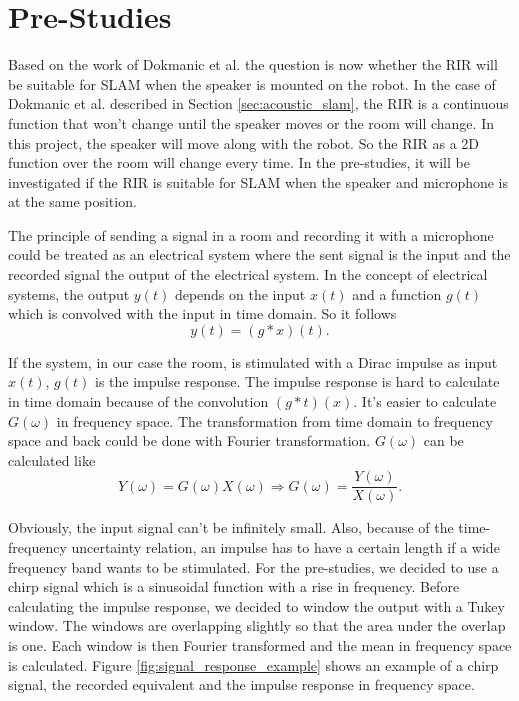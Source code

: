 \section{Pre-Studies}
\label{chap:pre_studies}

Based on the work of Dokmanic et al. \cite{dokmanic_roomrecslam_2016} the question is now whether the RIR will be suitable for SLAM when the speaker is mounted on the robot. In the case of Dokmanic et al. \cite{dokmanic_roomrecslam_2016} described in Section \ref{sec:acoustic_slam}, the RIR is a continuous function that won't change until the speaker moves or the room will change. In this project, the speaker will move along with the robot. So the RIR as a 2D function over the room will change every time. In the pre-studies, it will be investigated if the RIR is suitable for SLAM when the speaker and microphone is at the same position.

The principle of sending a signal in a room and recording it with a microphone could be treated as an electrical system where the sent signal is the input and the recorded signal the output of the electrical system. In the concept of electrical systems, the output $y(t)$ depends on the input $x(t)$ and a function $g(t)$ which is convolved with the input in time domain. So it follows
$$
y(t) = (g * x)(t) \text{.}
$$

If the system, in our case the room, is stimulated with a Dirac impulse as input $x(t)$, $g(t)$ is the impulse response. The impulse response is hard to calculate in time domain because of the convolution $(g * t)(x)$. It's easier to calculate $G(\omega)$ in frequency space. The transformation from time domain to frequency space and back could be done with Fourier transformation. $G(\omega)$ can be calculated like
$$
Y(\omega) = G(\omega) X(\omega) \Rightarrow G(\omega) = \frac{Y(\omega)}{X(\omega)}\text{.}
$$

Obviously, the input signal can't be infinitely small. Also, because of the time-frequency uncertainty relation, an impulse has to have a certain length if a wide frequency band wants to be stimulated. For the pre-studies, we decided to use a chirp signal which is a sinusoidal function with a rise in frequency. Before calculating the impulse response, we decided to window the output with a Tukey window. The windows are overlapping slightly so that the area under the overlap is one. Each window is then Fourier transformed and the mean in frequency space is calculated. Figure \ref{fig:signal_response_example} shows an example of a chirp signal, the recorded equivalent and the impulse response in frequency space.

